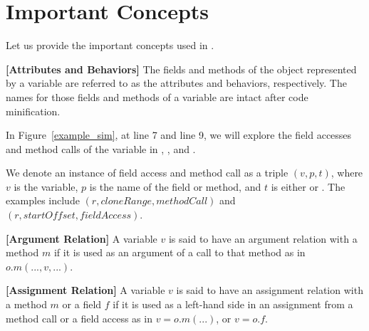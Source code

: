 \section{Important Concepts}
\label{concepts:sec}

Let us provide the important concepts used in {\tool}.

\begin{definition}{\bf [Attributes and Behaviors]}
  The fields and methods of the object represented by a variable are
  referred to as the attributes and behaviors, respectively. The names
  for those fields and methods of a variable are intact after code
  minification.
\end{definition}


In Figure~\ref{example_sim}, at line 7 and line 9, we will explore the
field accesses and method calls of the variable  in
, , and .

We denote an instance of field access and method call as a triple $(v,
p, t)$, where $v$ is the variable, $p$ is the name of the field or
method, and $t$ is either  or .
The examples include $(r, cloneRange, methodCall)$ and $(r,
startOffset, fieldAccess)$.



\begin{definition}{\bf [Argument Relation]}
  A variable $v$ is said to have an argument relation with a method
  $m$ if it is used as an argument of a call to that method as in
  $o.m(...,v,...)$.
\end{definition}

\begin{definition}{\bf [Assignment Relation]}
  A variable $v$ is said to have an assignment relation with a method
  $m$ or a field $f$ if it is used as a left-hand side in an
  assignment from a method call or a field access as in $v =
  o.m(...)$, or $v = o.f$.
\end{definition}



